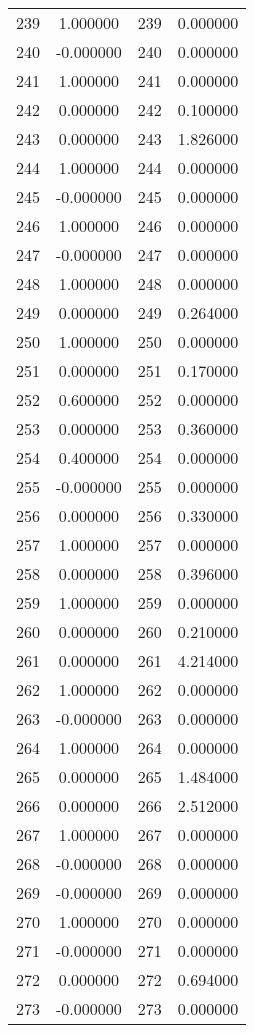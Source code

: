 \documentclass[12pt]{article}
\begin{document}
\begin{longtable}{@{}cccc@{}}
239 & 1.000000 & 239 & 0.000000 \\
240 & -0.000000 & 240 & 0.000000 \\
241 & 1.000000 & 241 & 0.000000 \\
242 & 0.000000 & 242 & 0.100000 \\
243 & 0.000000 & 243 & 1.826000 \\
244 & 1.000000 & 244 & 0.000000 \\
245 & -0.000000 & 245 & 0.000000 \\
246 & 1.000000 & 246 & 0.000000 \\
247 & -0.000000 & 247 & 0.000000 \\
248 & 1.000000 & 248 & 0.000000 \\
249 & 0.000000 & 249 & 0.264000 \\
250 & 1.000000 & 250 & 0.000000 \\
251 & 0.000000 & 251 & 0.170000 \\
252 & 0.600000 & 252 & 0.000000 \\
253 & 0.000000 & 253 & 0.360000 \\
254 & 0.400000 & 254 & 0.000000 \\
255 & -0.000000 & 255 & 0.000000 \\
256 & 0.000000 & 256 & 0.330000 \\
257 & 1.000000 & 257 & 0.000000 \\
258 & 0.000000 & 258 & 0.396000 \\
259 & 1.000000 & 259 & 0.000000 \\
260 & 0.000000 & 260 & 0.210000 \\
261 & 0.000000 & 261 & 4.214000 \\
262 & 1.000000 & 262 & 0.000000 \\
263 & -0.000000 & 263 & 0.000000 \\
264 & 1.000000 & 264 & 0.000000 \\
265 & 0.000000 & 265 & 1.484000 \\
266 & 0.000000 & 266 & 2.512000 \\
267 & 1.000000 & 267 & 0.000000 \\
268 & -0.000000 & 268 & 0.000000 \\
269 & -0.000000 & 269 & 0.000000 \\
270 & 1.000000 & 270 & 0.000000 \\
271 & -0.000000 & 271 & 0.000000 \\
272 & 0.000000 & 272 & 0.694000 \\
273 & -0.000000 & 273 & 0.000000 \\

\end{longtable}
\end{document}
